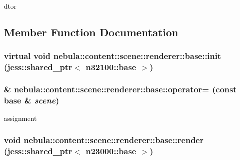dtor 

\subsection{Member Function Documentation}
\hypertarget{classnebula_1_1content_1_1scene_1_1renderer_1_1base_a64766dd49087647db882e225195036d3}{
\subsubsection[{init}]{\setlength{\rightskip}{0pt plus 5cm}virtual void nebula::content::scene::renderer::base::init (jess::shared\_\-ptr$<$ {\bf n32100::base} $>$)}}
\label{classnebula_1_1content_1_1scene_1_1renderer_1_1base_a64766dd49087647db882e225195036d3}
\hypertarget{classnebula_1_1content_1_1scene_1_1renderer_1_1base_ad5bdfb8cf4fbdb0a833e604a5ca30e59}{
\subsubsection[{operator=}]{\& nebula::content::scene::renderer::base::operator= (const {\bf base} \& {\em scene})}}
\label{classnebula_1_1content_1_1scene_1_1renderer_1_1base_ad5bdfb8cf4fbdb0a833e604a5ca30e59}


assignment \hypertarget{classnebula_1_1content_1_1scene_1_1renderer_1_1base_af3e68dfb9ae7802dc961638a267c5c52}{
\subsubsection[{render}]{\setlength{\rightskip}{0pt plus 5cm}void nebula::content::scene::renderer::base::render (jess::shared\_\-ptr$<$ {\bf n23000::base} $>$)}}
\label{classnebula_1_1content_1_1scene_1_1renderer_1_1base_af3e68dfb9ae7802dc961638a267c5c52}



